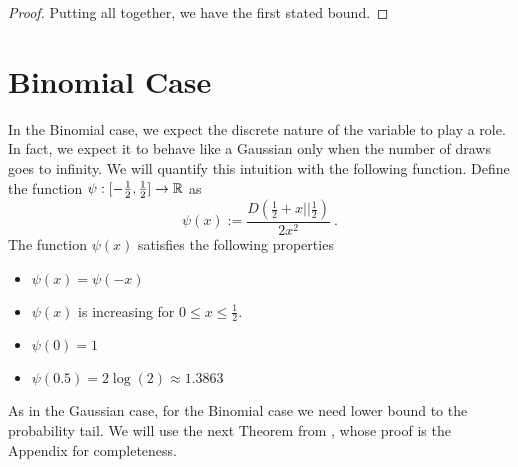 \documentclass{article} %
\begin{document}
\begin{proof}
Putting all together, we have the first stated bound.
\end{proof}

\section{Binomial Case}

In the Binomial case, we expect the discrete nature of the variable to play a role. In fact, we expect it to behave like a Gaussian only when the number of draws goes to infinity.
We will quantify this intuition with the following function.
Define the function $\psi:[-\frac{1}{2},\frac{1}{2}] \rightarrow \mathbb{R}$ as
\[
\psi(x):=\frac{D(\frac{1}{2}+x||\frac{1}{2})}{2 x^2}~.
\]
The function $\psi(x)$ satisfies the following properties
\begin{itemize}
\item $\psi(x)=\psi(-x)$
\item $\psi(x)$ is increasing for $0\leq x \leq\frac{1}{2}$.
\item $\psi(0)=1$
\item $\psi(0.5)=2 \log(2) \approx 1.3863$
\end{itemize}

As in the Gaussian case, for the Binomial case we need lower bound to the probability tail.
We will use the next Theorem from \cite{nOrabona13}, whose proof is the Appendix for completeness.
\end{document}
